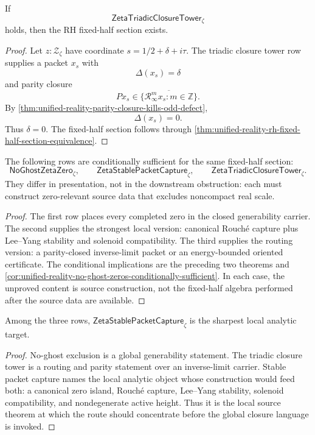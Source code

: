 \begin{theorem}
\label{thm:unified-reality-zeta-triadic-closure-tower-conditionally-sufficient}
If
$$
\mathsf{ZetaTriadicClosureTower}_{\zeta}
$$
holds, then the RH fixed-half section exists.
\end{theorem}

\begin{proof}
Let $z:\mathcal Z_{\zeta}$ have coordinate $s=1/2+\delta+i\tau$.  The
triadic closure tower row supplies a packet $x_s$ with
$$
\Delta(x_s)=\delta
$$
and parity closure
$$
P x_s\in\overline{\{\mathcal R_\infty^m x_s:m\in\mathbb Z\}}.
$$
By
\autoref{thm:unified-reality-parity-closure-kills-odd-defect},
$$
\Delta(x_s)=0.
$$
Thus $\delta=0$.  The fixed-half section follows through
\autoref{thm:unified-reality-rh-fixed-half-section-equivalence}.
\end{proof}

\begin{corollary}
\label{cor:unified-reality-three-source-rows-one-proof-target}
The following rows are conditionally sufficient for the same fixed-half
section:
$$
\mathsf{NoGhostZetaZero}_{\zeta},
\qquad
\mathsf{ZetaStablePacketCapture}_{\zeta},
\qquad
\mathsf{ZetaTriadicClosureTower}_{\zeta}.
$$
They differ in presentation, not in the downstream obstruction: each must
construct zero-relevant source data that excludes noncompact real scale.
\end{corollary}

\begin{proof}
The first row places every completed zero in the closed generability
carrier.  The second supplies the strongest local version: canonical
Rouch\'e capture plus Lee--Yang stability and solenoid compatibility.
The third supplies the routing version: a parity-closed inverse-limit
packet or an energy-bounded oriented certificate.  The conditional
implications are the preceding two theorems and
\autoref{cor:unified-reality-no-ghost-zeros-conditionally-sufficient}.
In each case, the unproved content is source construction, not the
fixed-half algebra performed after the source data are available.
\end{proof}

\begin{corollary}
\label{cor:unified-reality-stable-packet-capture-sharpest-local-target}
Among the three rows, $\mathsf{ZetaStablePacketCapture}_{\zeta}$ is the
sharpest local analytic target.
\end{corollary}

\begin{proof}
No-ghost exclusion is a global generability statement.  The triadic
closure tower is a routing and parity statement over an inverse-limit
carrier.  Stable packet capture names the local analytic object whose
construction would feed both: a canonical zero island, Rouch\'e capture,
Lee--Yang stability, solenoid compatibility, and nondegenerate active
height.  Thus it is the local source theorem at which the route should
concentrate before the global closure language is invoked.
\end{proof}
